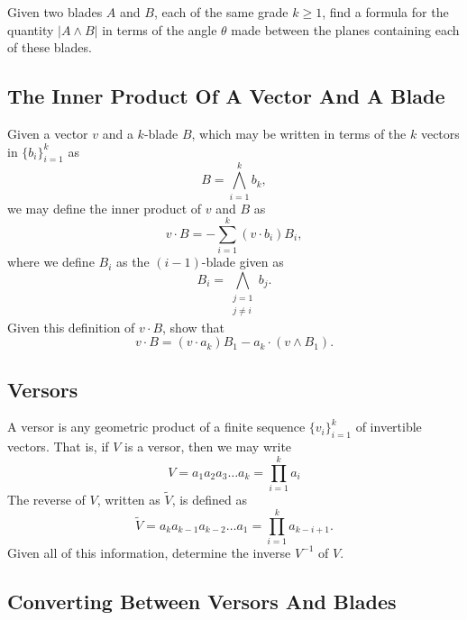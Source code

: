 \documentclass{article}
\begin{document}
Given two blades $A$ and $B$, each of the same grade $k\geq 1$, find a formula for the quantity $|A\wedge B|$
in terms of the angle $\theta$ made between the planes containing each of these blades.

\subsection{The Inner Product Of A Vector And A Blade}

Given a vector $v$ and a $k$-blade $B$, which may be written in terms
of the $k$ vectors in $\{b_i\}_{i=1}^k$ as
\begin{equation}
B = \bigwedge_{i=1}^k b_k,
\end{equation}
we may define the inner product of $v$ and $B$ as
\begin{equation}
v\cdot B = -\sum_{i=1}^k (v\cdot b_i)B_i,
\end{equation}
where we define $B_i$ as the $(i-1)$-blade given as
\begin{equation}
B_i = \bigwedge_{\substack{j=1\\j\neq i}} b_j.
\end{equation}
Given this definition of $v\cdot B$, show that
\begin{equation}
v\cdot B = (v\cdot a_k)B_1 - a_k\cdot(v\wedge B_1).
\end{equation}

\subsection{Versors}

A versor is any geometric product of a finite sequence $\{v_i\}_{i=1}^k$ of invertible vectors.
That is, if $V$ is a versor, then we may write
\begin{equation}
V = a_1a_2a_3\dots a_k = \prod_{i=1}^k a_i
\end{equation}
The reverse of $V$, written as $\tilde{V}$, is defined as
\begin{equation}
\tilde{V} = a_ka_{k-1}a_{k-2}\dots a_1 = \prod_{i=1}^k a_{k-i+1}.
\end{equation}
Given all of this information, determine the inverse $V^{-1}$ of $V$.

\subsection{Converting Between Versors And Blades}\label{prob_blade_versor_conversion}
\end{document}
